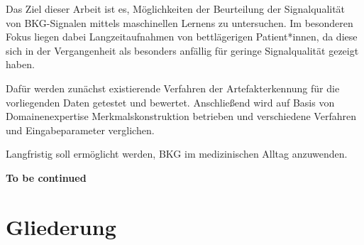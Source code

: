 Das Ziel dieser Arbeit ist es, Möglichkeiten der Beurteilung der Signalqualität von \ac{BKG}-Signalen mittels maschinellen Lernens zu untersuchen. Im besonderen Fokus liegen dabei Langzeitaufnahmen von bettlägerigen Patient*innen, da diese sich in der Vergangenheit als besonders anfällig für geringe Signalqualität gezeigt haben.

Dafür werden zunächst existierende Verfahren der Artefakterkennung für die vorliegenden Daten getestet und bewertet. Anschließend wird auf Basis von Domainenexpertise Merkmalskonstruktion betrieben und verschiedene Verfahren und Eingabeparameter verglichen. %

Langfristig soll ermöglicht werden, \acf{BKG} im medizinischen Alltag anzuwenden. %

\textbf{To be continued}




\section{Gliederung}
